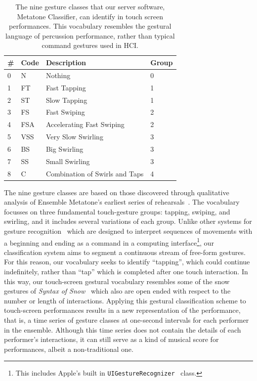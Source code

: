 \documentclass[graybox]{svmult}
\begin{document}
\begin{table}
\begin{center}
    \begin{tabular}{|l|l|l|l|}
    \hline
    \# & Code & Description & Group \\ \hline
    0 & N   & Nothing & 0 \\
    1 & FT  & Fast Tapping & 1\\
    2 & ST  & Slow Tapping & 1\\
    3 & FS  & Fast Swiping & 2\\
    4 & FSA & Accelerating Fast Swiping & 2\\
    5 & VSS & Very Slow Swirling & 3\\
    6 & BS  & Big Swirling & 3\\
    7 & SS  & Small Swirling & 3\\
    8 & C   & Combination of Swirls and Taps & 4\\ \hline
    \end{tabular}
\end{center}
\caption{The nine gesture classes that our server software, Metatone
  Classifier, can identify in touch screen performances. This
  vocabulary resembles the gestural language of percussion
  performance, rather than typical command gestures used in HCI.}
\label{tab:gesture-classes}
\end{table}


The nine gesture classes are based on those discovered through
qualitative analysis of Ensemble Metatone's earliest series of
rehearsals~\cite{Martin:2014jk}. The vocabulary focusses on three
fundamental touch-gesture groups: tapping, swiping, and swirling, and
it includes several variations of each group. Unlike other systems for
gesture recognition~\cite{Wobbrock:2007kq} which are designed to
interpret sequences of movements with a beginning and ending as a
command in a computing interface\footnote{This includes Apple's built
  in \texttt{UIGestureRecognizer}~\cite{AppleDeveloper:2015rm}
  class.}, our classification system aims to segment a continuous
stream of free-form gestures. For this reason, our vocabulary seeks to
identify ``tapping'', which could continue indefinitely, rather than
``tap'' which is completed after one touch interaction. In this way,
our touch-screen gestural vocabulary resembles some of the snow
gestures of \emph{Syntax of Snow}~\cite{Burtner:2011fk} which also are
open ended with respect to the number or length of interactions.
Applying this gestural classification scheme to touch-screen
performances results in a new representation of the performance, that
is, a time series of gesture classes at one-second intervals for each
performer in the ensemble. Although this time series does not contain
the details of each performer's interactions, it can still serve as a
kind of musical score for performances, albeit a non-traditional one.
\end{document}
